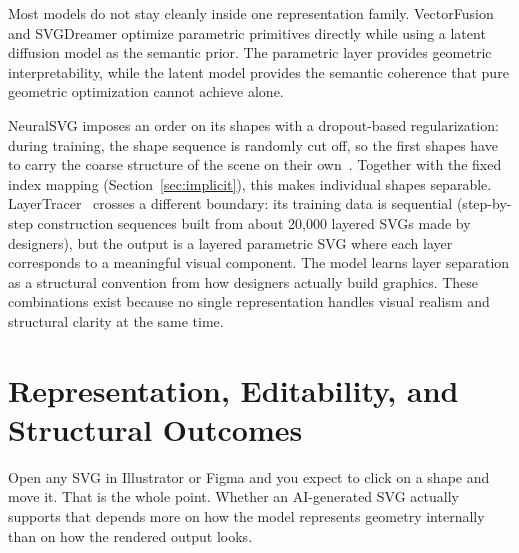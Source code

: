 Most models do not stay cleanly inside one representation family. VectorFusion and SVGDreamer optimize parametric
primitives directly while using a latent diffusion model as the semantic prior. The parametric layer provides geometric 
interpretability, while the latent model provides the semantic coherence that pure geometric optimization cannot achieve alone.

NeuralSVG imposes an order on its shapes with a dropout-based regularization: during training, the shape sequence 
is randomly cut off, so the first shapes have to carry the coarse structure of the scene on their 
own~\cite{polaczekNeuralSVGImplicitRepresentation2025}. Together with the fixed index mapping 
(Section~\ref{sec:implicit}), this makes individual shapes separable. 
LayerTracer~\cite{songLayerTracerCognitiveAlignedLayered2025} crosses a different boundary: its training data is sequential 
(step-by-step construction sequences built from about 20,000 layered SVGs made by designers), but the output is a layered parametric SVG where each layer 
corresponds to a meaningful visual component. The model learns layer separation as a structural convention from how designers 
actually build graphics. These combinations exist because no single 
representation handles visual realism and structural clarity at the same time.

\section{Representation, Editability, and Structural Outcomes}
\label{sec:rep_editability}

Open any SVG in Illustrator or Figma and you expect to click on a shape and move it. That is the whole point.
Whether an AI-generated SVG actually supports that depends more on how the model represents geometry internally 
than on how the rendered output looks.

